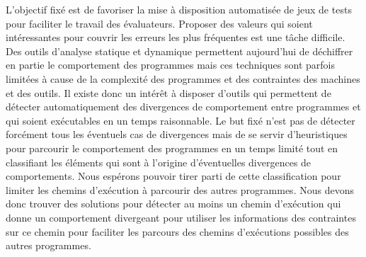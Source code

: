 L'objectif fixé est de favoriser la mise à disposition automatisée de jeux de tests pour faciliter le travail des évaluateurs. Proposer des valeurs qui soient intéressantes pour couvrir les erreurs les plus fréquentes est une tâche difficile. 
Des outils d'analyse statique et dynamique permettent aujourd'hui de déchiffrer en partie le comportement des programmes mais ces techniques sont parfois limitées à cause de la complexité des programmes et des contraintes des machines et des outils.
Il existe donc un intérêt à disposer d'outils qui permettent de détecter automatiquement des divergences de comportement entre programmes et qui soient exécutables en un temps raisonnable. 
Le but fixé n'est pas de détecter forcément tous les éventuels cas de divergences mais de se servir d'heuristiques pour parcourir le comportement des programmes en un temps limité tout en classifiant les éléments qui sont à l'origine d'éventuelles divergences de comportements. Nous espérons pouvoir tirer parti de cette classification pour limiter les chemins d'exécution à parcourir des autres programmes. Nous devons donc trouver des solutions pour détecter au moins un chemin d'exécution qui donne un comportement divergeant pour utiliser les informations des contraintes sur ce chemin pour faciliter les parcours des chemins d'exécutions possibles des autres programmes.

